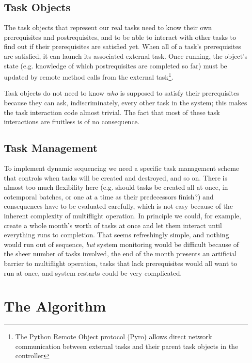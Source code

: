 \documentclass[11pt,a4paper]{report}
\begin{document}
\subsection{Task Objects}

The task objects that represent our real tasks need to know their own
prerequisites and postrequisites, and to be able to interact with other
tasks to find out if their prerequisites are satisfied yet. When all of
a task's prerequisites are satisfied, it can launch its associated
external task. Once running, the object's state (e.g. knowledge of which
postrequisites are completed so far) must be updated by remote method
calls from the external task\footnote{The Python Remote Object protocol
(Pyro) allows direct network communication between external tasks and
their parent task objects in the controller}. 

Task objects do not need to know {\em who} is supposed to satisfy their
prerequisites because they can ask, indiscriminately, every other task
in the system; this makes the task interaction code almost trivial. The
fact that most of these task interactions are fruitless is of no
consequence. 

\subsection{Task Management}

To implement dynamic sequencing we need a specific task management
scheme that controls when tasks will be created and destroyed, and so
on. There is almost too much flexibility here (e.g.  should tasks be
created all at once, in cotemporal batches, or one at a time as their
predecessors finish?) and consequences have to be evaluated carefully,
which is not easy because of the inherent complexity of multiflight
operation. In principle we could, for example, create a whole month's
worth of tasks at once and let them interact until everything runs to
completion. That seems refreshingly simple, and nothing would run out of
sequence, {\em but} system monitoring would be difficult because of the
sheer number of tasks involved, the end of the month presents an
artificial barrier to multiflight operation, tasks that lack
prerequisites would all want to run at once, and system restarts could
be very complicated. 


\section{The Algorithm}
\end{document}
